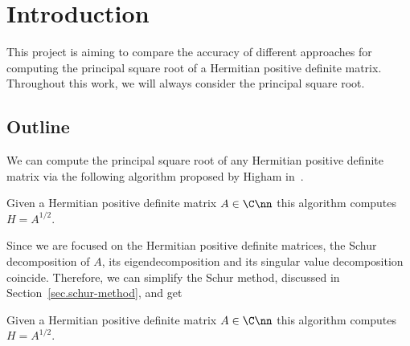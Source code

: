
\section{Introduction}
\label{sec.introduction}

This project is aiming to compare the accuracy of different approaches for
computing the principal square root of a Hermitian positive definite
matrix.
Throughout this work, we will always consider the principal square root.

\subsection{Outline}

We can compute the principal square root of any Hermitian
positive definite matrix via the following algorithm proposed by Higham
in~.
\begin{algorithm}[h]
\caption{Given a Hermitian positive deﬁnite matrix $A\in \C\nn$ this
  algorithm computes $H = A^{1/2}$.}
\label{alg:sqrt-higham}
\begin{algorithmic}[1]
\end{algorithmic}
\end{algorithm}

Since we are focused on the Hermitian positive definite matrices, the Schur
decomposition of $A$, its eigendecomposition and its singular value
decomposition coincide.
Therefore, we can simplify the Schur method, discussed in
Section~\ref{sec.schur-method}, and get 
\begin{algorithm}[h]
\caption{Given a Hermitian positive deﬁnite matrix $A\in \C\nn$ this
  algorithm computes $H = A^{1/2}$.} 
\label{alg:sqrt-eigdecomp}
\begin{algorithmic}[1]
\end{algorithmic}
\end{algorithm}

